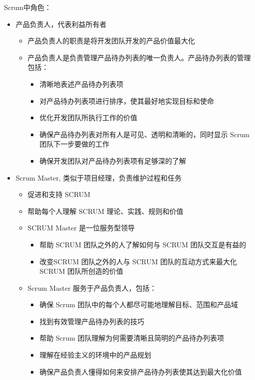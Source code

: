 Scrum中角色：
\begin{itemize}
    \item 产品负责人，代表利益所有者
    \begin{itemize}
        \item 产品负责人的职责是将开发团队开发的产品价值最大化
        \item 产品负责人是负责管理产品待办列表的唯一负责人。产品待办列表的管理包括：
        \begin{itemize}
            \item 清晰地表述产品待办列表项
            \item 对产品待办列表项进行排序，使其最好地实现目标和使命
            \item 优化开发团队所执行工作的价值
            \item 确保产品待办列表对所有人是可见、透明和清晰的，同时显示 Scrum 团队下一步要做的工作
            \item 确保开发团队对产品待办列表项有足够深的了解
        \end{itemize}
    \end{itemize}
    \item Scrum Master, 类似于项目经理，负责维护过程和任务
    \begin{itemize}
        \item 促进和支持 SCRUM
        \item 帮助每个人理解 SCRUM 理论、实践、规则和价值
        \item SCRUM Master 是一位服务型领导
        \begin{itemize}
            \item 帮助 SCRUM 团队之外的人了解如何与 SCRUM 团队交互是有益的
            \item 改变SCRUM 团队之外的人与 SCRUM 团队的互动方式来最大化 SCRUM 团队所创造的价值
        \end{itemize}
        \item Scrum Master 服务于产品负责人，包括：
        \begin{itemize}
            \item 确保 Scrum 团队中的每个人都尽可能地理解目标、范围和产品域
            \item 找到有效管理产品待办列表的技巧
            \item 帮助 Scrum 团队理解为何需要清晰且简明的产品待办列表项
            \item 理解在经验主义的环境中的产品规划
            \item 确保产品负责人懂得如何来安排产品待办列表使其达到最大化价值

\end{itemize}
\end{itemize}
\end{itemize}
